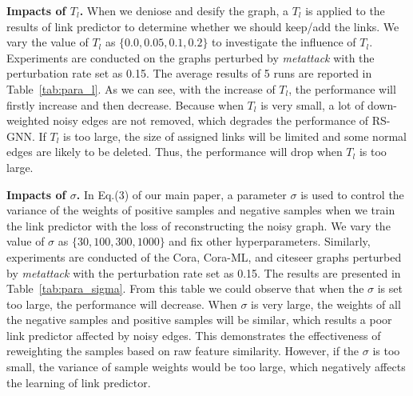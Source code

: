 \textbf{Impacts of $T_l$.} When we deniose and desify the graph, a $T_l$ is applied to the results of link predictor to determine whether we should keep/add the links. We vary the value of $T_l$ as $\{0.0, 0.05, 0.1, 0.2\}$ to investigate the influence of $T_l$. Experiments are conducted on the graphs perturbed by \textit{metattack} with the perturbation rate set as 0.15. The average results of 5 runs are reported in Table~\ref{tab:para_l}.  As we can see, with the increase of $T_l$, the performance will firstly increase and then decrease. Because when $T_l$ is very small, a lot of down-weighted noisy edges are not removed, which degrades the performance of RS-GNN. If $T_l$ is too large, the size of assigned links will be limited and some normal edges are likely to be deleted. Thus, the performance will drop when $T_l$ is too large.

\textbf{Impacts of $\sigma$.} In Eq.(3) of our main paper, a parameter $\sigma$ is used to control the variance of the weights of positive samples and negative samples when we train the link predictor with the loss of reconstructing the noisy graph. We vary the value of $\sigma$ as $\{30, 100, 300, 1000\}$ and fix other hyperparameters. Similarly, experiments are conducted of the Cora, Cora-ML, and citeseer graphs perturbed by \textit{metattack} with the perturbation rate set as 0.15. The results are presented in Table~\ref{tab:para_sigma}. From this table we could observe that when the $\sigma$ is set too large, the performance will decrease. When $\sigma$ is very large, the weights of all the negative samples and positive samples will be similar, which results a poor link predictor affected by noisy edges. This demonstrates the effectiveness of reweighting the samples based on raw feature similarity. However, if the $\sigma$ is too small, the variance of sample weights would be too large, which negatively affects the learning of link predictor.